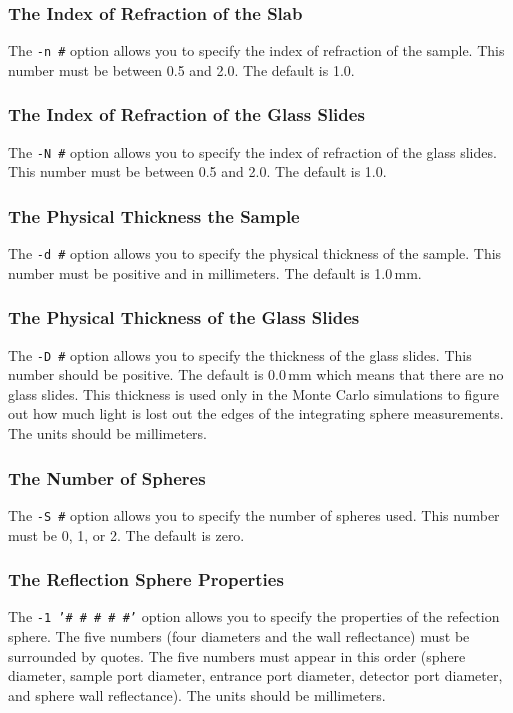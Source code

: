 \documentclass{article}
\begin{document}
\subsubsection{The Index of Refraction of the Slab}
The \texttt{-n \#} option allows you to specify the index of refraction of
the sample.  This number must be between 0.5 and 2.0.  The default is 1.0.

\subsubsection{The Index of Refraction of the Glass Slides}
The \texttt{-N \#} option allows you to specify the index of refraction of
the glass slides.  This number must be between 0.5 and 2.0.  The default is 1.0.

\subsubsection{The Physical Thickness the Sample}
The \texttt{-d \#} option allows you to specify the physical thickness of
the sample.  This number must be positive and in millimeters.  The default is 1.0\,mm.

\subsubsection{The Physical Thickness of the Glass Slides}
The \texttt{-D \#} option allows you to specify the thickness of
the glass slides.  This number should be positive.  The default is 0.0\,mm
which means that there are no glass slides.  This thickness is used
only in the Monte Carlo simulations to figure out how much light is lost
out the edges of the integrating sphere measurements.  The units should be
millimeters.

\subsubsection{The Number of Spheres}
The \texttt{-S \#} option allows you to specify the number of spheres used.
This number must be 0, 1, or 2.  The default is zero.

\subsubsection{The Reflection Sphere Properties}
The \texttt{-1 '\# \# \# \# \#'} option allows you to specify the properties
of the refection sphere. The five numbers (four diameters and the wall reflectance)
must be surrounded by quotes.  The 
five numbers must appear in this order (sphere diameter, sample port diameter,
entrance port diameter, detector port diameter, and sphere wall reflectance).
The units should be millimeters.
\end{document}
